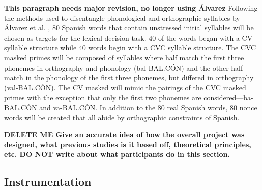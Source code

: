 \textbf{This paragraph needs major revision, no longer using Álvarez}
Following the methods used to disentangle phonological and orthographic syllables by Álvarez et al. \parencite*{Alvarez2004-nd}, 80 Spanish words that contain unstressed initial syllables will be chosen as targets for the lexical decision task. 40 of the words began with a CV syllable structure while 40 words begin with a CVC syllable structure. The CVC masked primes will be composed of syllables where half match the first three phonemes in orthography and phonology (bal-BAL.CÓN) and the other half match in the phonology of the first three phonemes, but differed in orthography (val-BAL.CÓN). The CV masked will mimic the pairings of the CVC masked primes with the exception that only the first two phonemes are considered—ba-BAL.CÓN and va-BAL.CÓN. In addition to the 80 real Spanish words, 80 nonce words will be created that all abide by orthographic constraints of Spanish.

\textbf{DELETE ME Give an accurate idea of how the overall project was designed, what previous studies is it based off, theoretical principles, etc.
DO NOT write about what participants do in this section.}

\subsection{Instrumentation}

